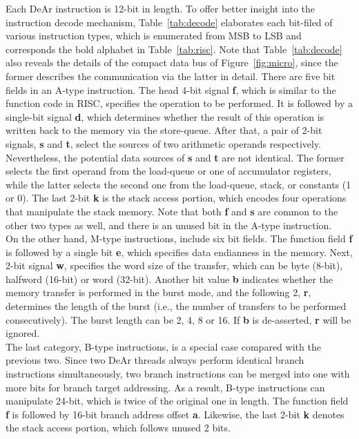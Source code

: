 Each DeAr instruction is 12-bit in length.
To offer better insight into the instruction decode mechanism, 
Table~\ref{tab:decode} elaborates each bit-filed of various instruction types, 
which is enumerated from MSB to LSB and corresponds the bold alphabet in Table~\ref{tab:risc}.
Note that Table~\ref{tab:decode} also reveals the details of the compact data bus of Figure~\ref{fig:micro}, 
since the former describes the communication via the latter in detail.
There are five bit fields in an A-type instruction.
The head 4-bit signal \textbf{f}, which is similar to the function code in RISC, specifies the operation to be performed.
It is followed by a single-bit signal \textbf{d}, which determines whether the result of this operation is written back to the memory via the store-queue.
After that, a pair of 2-bit signals, \textbf{s} and \textbf{t}, select the sources of two arithmetic operands respectively. 
Nevertheless, the potential data sources of \textbf{s} and \textbf{t} are not identical.
The former selects the first operand from the load-queue or one of accumulator registers, 
while the latter selects the second one from the load-queue, stack, or constants (1 or 0).
The last 2-bit \textbf{k} is the stack access portion, which encodes four operations that manipulate the stack memory.
Note that both \textbf{f} and \textbf{s} are common to the other two types as well, 
and there is an unused bit in the A-type instruction.
\\\indent On the other hand, M-type instructions, include six bit fields.
The function field \textbf{f} is followed by a single bit \textbf{e}, which specifies data endianness in the memory.
Next, 2-bit signal \textbf{w}, specifies the word size of the transfer, which can be byte (8-bit), halfword (16-bit) or word (32-bit).
Another bit value \textbf{b} indicates whether the memory transfer is performed in the burst mode, 
and the following 2, \textbf{r}, determines the length of the burst (i.e., the number of transfers to be performed consecutively).
The burst length can be 2, 4, 8 or 16.
If \textbf{b} is de-asserted, \textbf{r} will be ignored.
\\\indent The last category, B-type instructions, is a special case compared with the previous two.
Since two DeAr threads always perform identical branch instructions simultaneously, 
two branch instructions can be merged into one with more bits for branch target addressing.
As a result, B-type instructions can manipulate 24-bit, which is twice of the original one in length.
The function field \textbf{f} is followed by 16-bit branch address offset \textbf{a}.
Likewise, the last 2-bit \textbf{k} denotes the stack access portion, which follows unused 2 bits.

